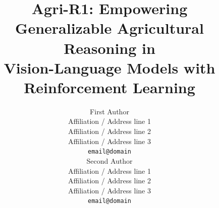 \documentclass[11pt]{article}
\title{Agri-R1: Empowering Generalizable Agricultural Reasoning in \\
Vision-Language Models with Reinforcement Learning}
\author{First Author \\
  Affiliation / Address line 1 \\
  Affiliation / Address line 2 \\
  Affiliation / Address line 3 \\
  \texttt{email@domain} \\\And
  Second Author \\
  Affiliation / Address line 1 \\
  Affiliation / Address line 2 \\
  Affiliation / Address line 3 \\
  \texttt{email@domain} \\}
\begin{document}
\maketitle
\begin{abstract}





\end{abstract}
\end{document}
